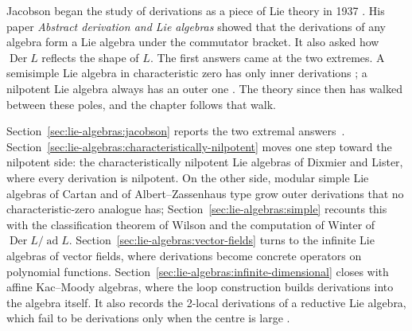 Jacobson began the study of derivations as a piece of Lie theory in 1937
\cite[p.~206]{Jacobson1937}.
His paper \emph{Abstract derivation and Lie algebras} \cite{Jacobson1937}
showed that the derivations of any algebra form a Lie algebra under the
commutator bracket.
It also asked how $\operatorname{Der} L$ reflects
the shape of $L$. The first answers came at the two extremes. A semisimple
Lie algebra in characteristic zero has only inner derivations
\cite[Theorem in \S 5.3, p.~23]{Humphreys1972}; a nilpotent Lie algebra
always has an outer one \cite[Exercise 10, p.~14]{Humphreys1972}. The
theory since then has walked between these poles, and the chapter follows
that walk.

Section~\ref{sec:lie-algebras:jacobson} reports the two extremal answers~\cite[Corollary~1.3, p.~2]{ChenLuoXu2026}.
Section~\ref{sec:lie-algebras:characteristically-nilpotent} moves one step
toward the nilpotent side: the characteristically nilpotent Lie algebras of
Dixmier and Lister, where every derivation is nilpotent. On the other side,
modular simple Lie algebras of Cartan and of Albert--Zassenhaus type grow
outer derivations that no characteristic-zero analogue has;
Section~\ref{sec:lie-algebras:simple} recounts this with the classification
theorem of Wilson and the computation of Winter of $\operatorname{Der}
L/\operatorname{ad} L$. Section~\ref{sec:lie-algebras:vector-fields} turns to
the infinite Lie algebras of vector fields, where derivations become concrete
operators on polynomial functions.
Section~\ref{sec:lie-algebras:infinite-dimensional} closes with affine
Kac--Moody algebras, where the loop construction builds derivations into the
algebra itself. It also records the 2-local derivations of a reductive Lie
algebra, which fail to be derivations only when the centre is large
\cite[Corollary~1.3, p.~2]{ChenLuoXu2026}.

